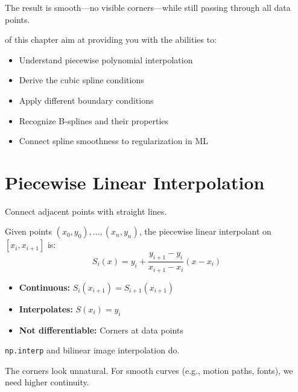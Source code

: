 The result is smooth---no visible corners---while still passing through all data points.

\vspace{2.5em}
 of this chapter aim at providing you with the abilities to:
\begin{itemize}
    \item Understand piecewise polynomial interpolation
    \item Derive the cubic spline conditions
    \item Apply different boundary conditions
    \item Recognize B-splines and their properties
    \item Connect spline smoothness to regularization in ML
\end{itemize}





\newpage
\section{Piecewise Linear Interpolation}

 Connect adjacent points with straight lines.

Given points $(x_0, y_0), \ldots, (x_n, y_n)$, the piecewise linear interpolant on $[x_i, x_{i+1}]$ is:
\begin{equation}
    S_i(x) = y_i + \frac{y_{i+1} - y_i}{x_{i+1} - x_i}(x - x_i)
\end{equation}

\begin{itemize}
    \item \textbf{Continuous:} $S_i(x_{i+1}) = S_{i+1}(x_{i+1})$ \checkmark
    \item \textbf{Interpolates:} $S(x_i) = y_i$ \checkmark
    \item \textbf{Not differentiable:} Corners at data points
\end{itemize}

 \texttt{np.interp} and bilinear image interpolation do.

 The corners look unnatural. For smooth curves (e.g., motion paths, fonts), we need higher continuity.




